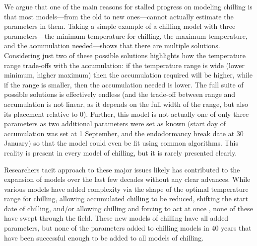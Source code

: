 \documentclass[11pt]{article}
\begin{document}
We argue that one of the main reasons for stalled progress on modeling chilling is that most models---from the old to new ones---cannot actually estimate the parameters in them. Taking a simple example of a chilling model with three parameters---the minimum temperature for chilling, the maximum temperature, and the accumulation needed---shows that there are multiple solutions. Considering just two of these possible solutions highlights how the temperature range trade-offs with the accumulation: if the temperature range is wide (lower minimum, higher maximum) then the accumulation required will be higher, while if the range is smaller, then the accumulation needed is lower. The full suite of possible solutions is effectively endless (and the trade-off between range and accumulation is not linear, as it depends on the full width of the range, but also its placement relative to 0). Further, this model is not actually one of only three parameters as two additional parameters were set as known (start day of accumulation was set at 1 September, and the endodormancy break date at 30 January) so that the model could even be fit using common algorithms. %
This reality is present in every model of chilling, but it is rarely presented clearly. %

Researchers tacit approach to these major issues likely has contributed to the expansion of models over the last few decades without any clear advances. While various models have added complexity via the shape of the optimal temperature range for chilling, allowing accumulated chilling to be reduced, shifting the start date of chilling, and/or allowing chilling and forcing to act at once \citep{lued2009,gusewell2017,hanninen1990modelling,Kramer1994}, none of these have swept through the field. These new models of chilling have all added parameters, but none of the parameters added to chilling models in 40 years that have been successful enough to be added to all models of chilling. 
\end{document}
